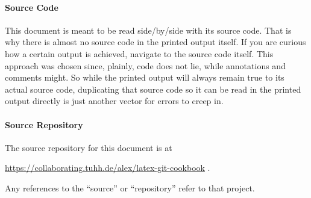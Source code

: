 \paragraph{Source Code}
This document is meant to be read side\-/by\-/side with its source code.
That is why there is almost no source code in the printed output itself.
If you are curious how a certain output is achieved, navigate to the source code
itself.
This approach was chosen since, plainly, code does not lie, while annotations and
comments might.
So while the printed output will always remain true to its actual source code,
duplicating that source code so it can be read in the printed output directly
is just another vector for errors to creep in.

\paragraph{Source Repository}
The source repository for this document is at
\begin{center}
    \url{https://collaborating.tuhh.de/alex/latex-git-cookbook} .
\end{center}
Any references to the \enquote{source} or \enquote{repository} refer to that project.
